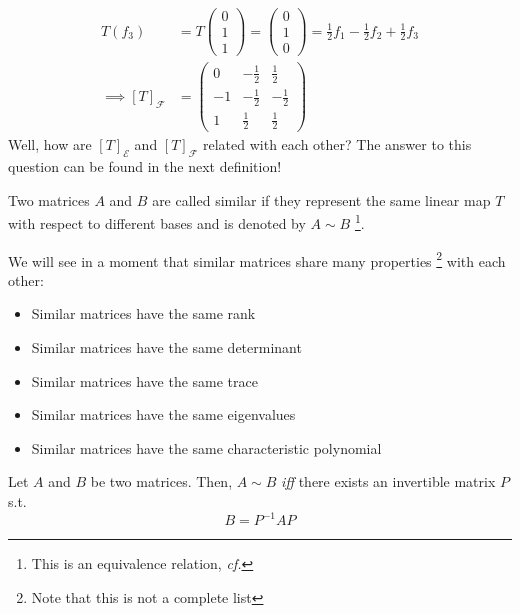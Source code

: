 \begin{exm}
\begin{align*}
		T(f_3)          & =T\begin{pmatrix}0\\1\\1\end{pmatrix}=\begin{pmatrix}0\\1\\0\end{pmatrix}=\frac{1}{2}f_1-\frac{1}{2}f_2+\frac{1}{2}f_3  \\
		\implies
		[T]_\mathcal{F} & =\begin{pmatrix}
			0  & -\frac{1}{2} & \frac{1}{2}  \\[4pt]
			-1 & -\frac{1}{2} & -\frac{1}{2} \\[4pt]
			1  & \frac{1}{2}  & \frac{1}{2}
		\end{pmatrix}
	\end{align*}
	Well, how are $[T]_\mathcal{E}$ and $[T]_\mathcal{F}$ related with each other?
	The answer to this question can be found in the next definition!
\end{exm}

\begin{definition}\label{def-similar-matrices}
	Two matrices $A$ and $B$ are called similar if they represent the same linear
	map $T$ with respect to different bases and is denoted by $A \sim B$
	\footnote{This is an equivalence relation, \textit{cf.} }.
\end{definition}

\begin{rem}\label{rem-similar-matrix-properties}
	We will see in a moment that similar matrices share many properties
	\footnote{Note that this is not a complete list} with each other:
	\begin{itemize}
		\item Similar matrices have the same rank
		\item Similar matrices have the same determinant
		\item Similar matrices have the same trace
		\item Similar matrices have the same eigenvalues
		\item Similar matrices have the same characteristic polynomial
	\end{itemize}
\end{rem}

\begin{thm}\label{thm-similar-matrices-inverse-equation}
	Let $A$ and $B$ be two matrices. Then, $A \sim B$ \textit{iff} there exists
	an invertible matrix $P$ s.t.
	\begin{equation}
		B=P^{-1}AP
	\end{equation}
\end{thm}

